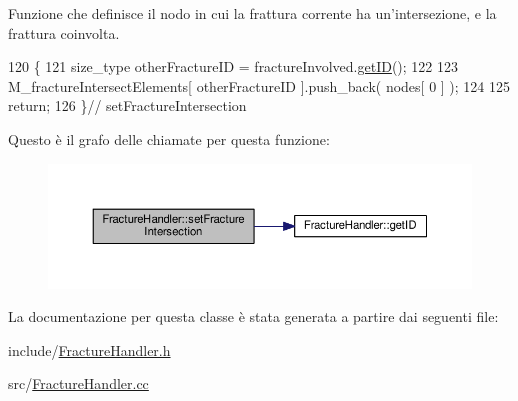 Funzione che definisce il nodo in cui la frattura corrente ha un'intersezione, e la frattura coinvolta. 


\begin{DoxyCode}
120 \{
121     size\_type otherFractureID = fractureInvolved.\hyperlink{classFractureHandler_a439092fd58fa5d3295bffb71861cf7b9}{getID}();
122 
123     M\_fractureIntersectElements[ otherFractureID ].push\_back( nodes[ 0 ] );
124 
125     \textcolor{keywordflow}{return};
126 \}\textcolor{comment}{// setFractureIntersection}
\end{DoxyCode}


Questo è il grafo delle chiamate per questa funzione\-:
\nopagebreak
\begin{figure}[H]
\begin{center}
\leavevmode
\includegraphics[width=350pt]{classFractureHandler_a391031a951667a3d8b2f633602856ee3_cgraph}
\end{center}
\end{figure}




La documentazione per questa classe è stata generata a partire dai seguenti file\-:\begin{DoxyCompactItemize}
\item 
include/\hyperlink{FractureHandler_8h}{Fracture\-Handler.\-h}\item 
src/\hyperlink{FractureHandler_8cc}{Fracture\-Handler.\-cc}\end{DoxyCompactItemize}
